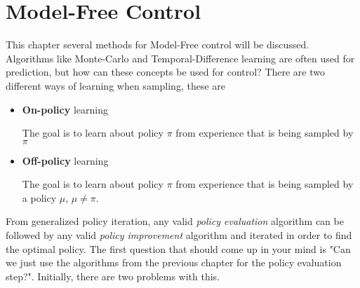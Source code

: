 \chapter{Model-Free Control}

This chapter several methods for Model-Free control will be discussed. Algorithms like Monte-Carlo and Temporal-Difference learning are often used for prediction, but how can these concepts be used for control? There are two different ways of learning when sampling, these are 

\begin{itemize}
	\item \textbf{On-policy} learning
	
	The goal is to learn about policy $\pi$ from experience that is being sampled by $\pi$
	
	\item \textbf{Off-policy} learning
	
	The goal is to learn about policy $\pi$ from experience that is being sampled by a policy $\mu$, $\mu \neq \pi$.
\end{itemize}

From generalized policy iteration, any valid \textit{policy evaluation} algorithm can be followed by any valid \textit{policy improvement} algorithm and iterated in order to find the optimal policy. The first question that should come up in your mind is "Can we just use the algorithms from the previous chapter for the policy evaluation step?". Initially, there are two problems with this.

